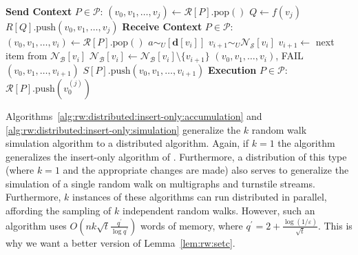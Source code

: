 \documentclass[10]{article}
\newcommand{\push}[1]{\text{push} \left ( #1 \right )}
\newcommand{\pop}{\text{pop}()}
\begin{document}
\begin{algorithm}[htbp]
\begin{flushleft}
\begin{algorithmic}[1]
	\Statex \textbf{Send Context} $P \in \mathcal{P}$:
  			\State $(v_0, v_1, \dots, v_j) \gets \mathcal{R}[P].\pop$
			\State $Q \gets f(v_j)$
			\State $R[Q].\push{v_0, v_1, \dots, v_{j}}$
  		\EndWhile
	\Statex \textbf{Receive Context} $P \in \mathcal{P}$:
  			\State $(v_0, v_1, \dots, v_i) \gets \mathcal{R}[P].\pop$
			\State $a \sim_U [\mathbf{d}[{v_i}]] $
				\State $v_{i+1} \sim_U \mathcal{N}_\mathcal{S}[v_i]$
			\Else
					\State $v_{i+1} \gets$ next item from $\mathcal{N}_\mathcal{B}[v_i]$
					\State $\mathcal{N}_\mathcal{B}[v_i] \gets \mathcal{N}_\mathcal{B}[v_i] \setminus \{v_{i+1}\}$
				\Else
					\State \Return $(v_0, v_1, \dots, v_i)$, FAIL
				\EndIf
			\EndIf
				\State \Return $(v_0, v_1, \dots, v_{i+1})$
			\Else
				\State $S[P].\push{v_0, v_1, \dots, v_{i+1}}$
			\EndIf
  		\EndWhile
	\Statex \textbf{Execution} $P \in \mathcal{P}$:
				\State $\mathcal{R}[P].\push{v_0^{(j)}}$
			\EndIf
		\EndParFor
\end{algorithmic}
\end{flushleft}
\end{algorithm}


Algorithms~\ref{alg:rw:distributed:insert-only:accumulation} and \ref{alg:rw:distributed:insert-only:simulation} generalize the $k$ random walk simulation algorithm to a distributed algorithm. 
Again, if $k=1$ the algorithm generalizes the insert-only algorithm of \cite{jin2018simulating}.
Furthermore, a distribution of this type (where $k=1$ and the appropriate changes are made) also serves to generalize the simulation of a single random walk on multigraphs and turnstile streams.
Furthermore, $k$ instances of these algorithms can run distributed in parallel, affording the sampling of $k$ independent random walks. 
However, such an algorithm uses $O \left (nk\sqrt{t} \frac{q^\prime}{\log q^\prime} \right )$ words of memory, where $q^\prime = 2 + \frac{\log(1/\varepsilon)}{\sqrt{t}}$.
This is why we want a better version of Lemma~\ref{lem:rw:setc}.
\end{document}
